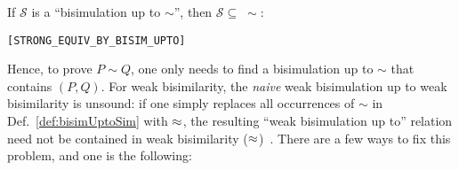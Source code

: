\begin{theorem}
If $\mathcal{S}$ is a ``bisimulation up to $\sim$'', then
$\mathcal{S} \subseteq\;\sim$:
\begin{alltt}
\HOLTokenTurnstile{}   \HOLSymConst{\HOLTokenConj{}}    \HOLSymConst{\HOLTokenImp{}}  \HOLSymConst{\HOLTokenStrongEQ} \hfill{[STRONG_EQUIV_BY_BISIM_UPTO]}
\end{alltt}
\end{theorem}
Hence, to prove $P \sim Q$, one only needs to find a bisimulation
up to $\sim$ that contains $(P, Q)$.
%
For weak bisimilarity, the \emph{naive} weak bisimulation up to weak bisimilarity
is unsound: if one simply replaces all occurrences of $\sim$ in
Def.~\ref{def:bisimUptoSim} with $\approx$, the resulting
``weak bisimulation up to'' relation need not be contained in weak
  bisimilarity ($\approx$)~\cite{PoSa2019}.
There are a few ways to fix this problem, and one is the following:
%
